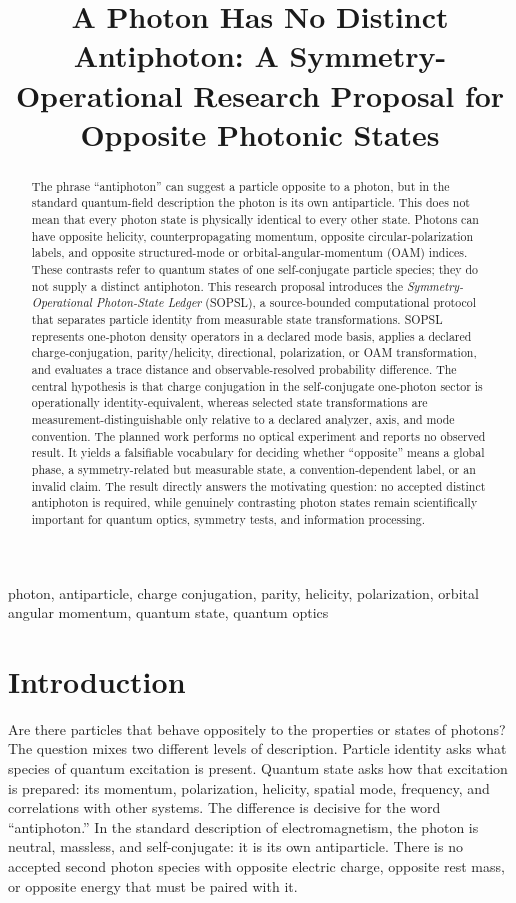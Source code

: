 \documentclass[conference]{../../../../Conference-LaTeX-template_10-17-19/IEEEtran}
\title{A Photon Has No Distinct Antiphoton: A Symmetry-Operational Research Proposal for Opposite Photonic States}
\author{\IEEEauthorblockN{Anonymous Research Proposal}}
\begin{document}
\maketitle

\begin{abstract}
The phrase ``antiphoton'' can suggest a particle opposite to a photon, but in the standard quantum-field description the photon is its own antiparticle. This does not mean that every photon state is physically identical to every other state. Photons can have opposite helicity, counterpropagating momentum, opposite circular-polarization labels, and opposite structured-mode or orbital-angular-momentum (OAM) indices. These contrasts refer to quantum states of one self-conjugate particle species; they do not supply a distinct antiphoton. This research proposal introduces the \emph{Symmetry-Operational Photon-State Ledger} (SOPSL), a source-bounded computational protocol that separates particle identity from measurable state transformations. SOPSL represents one-photon density operators in a declared mode basis, applies a declared charge-conjugation, parity/helicity, directional, polarization, or OAM transformation, and evaluates a trace distance and observable-resolved probability difference. The central hypothesis is that charge conjugation in the self-conjugate one-photon sector is operationally identity-equivalent, whereas selected state transformations are measurement-distinguishable only relative to a declared analyzer, axis, and mode convention. The planned work performs no optical experiment and reports no observed result. It yields a falsifiable vocabulary for deciding whether ``opposite'' means a global phase, a symmetry-related but measurable state, a convention-dependent label, or an invalid claim. The result directly answers the motivating question: no accepted distinct antiphoton is required, while genuinely contrasting photon states remain scientifically important for quantum optics, symmetry tests, and information processing.
\end{abstract}

\begin{IEEEkeywords}
photon, antiparticle, charge conjugation, parity, helicity, polarization, orbital angular momentum, quantum state, quantum optics
\end{IEEEkeywords}

\section{Introduction}
Are there particles that behave oppositely to the properties or states of photons? The question mixes two different levels of description. Particle identity asks what species of quantum excitation is present. Quantum state asks how that excitation is prepared: its momentum, polarization, helicity, spatial mode, frequency, and correlations with other systems. The difference is decisive for the word ``antiphoton.'' In the standard description of electromagnetism, the photon is neutral, massless, and self-conjugate: it is its own antiparticle. There is no accepted second photon species with opposite electric charge, opposite rest mass, or opposite energy that must be paired with it.
\end{document}
